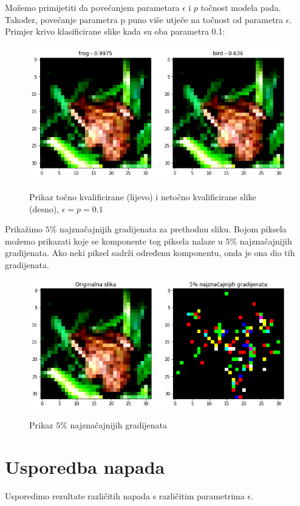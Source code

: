 Možemo primijetiti da povećanjem parametara $\epsilon$ i $p$ točnost modela pada. Također, povećanje parametra p puno više utječe na točnost od parametra $\epsilon$. Primjer krivo klasificirane slike kada su oba parametra 0.1:
\begin{figure}[H]
	\centering
	{{\includegraphics[width=11.5cm]{slike/napadi/selected-grads-example.png} }}%
	\caption{Prikaz točno kvalificirane (lijevo) i netočno kvalificirane slike (desno), $\epsilon = p = 0.1$}%
	\label{fig:pixel_fgsm}%
\end{figure}

Prikažimo $5\%$ najznačajnijih gradijenata za prethodnu sliku. Bojom piksela možemo prikazati koje se komponente tog piksela nalaze u $5\%$ najznačajnijih gradijenata. Ako neki piksel sadrži određenu komponentu, onda je ona dio tih gradijenata.
\begin{figure}[H]
	\centering
	{{\includegraphics[width=11.5cm]{slike/napadi/selected-grads-visualisation.png} }}%
	\caption{Prikaz $5\%$ najznačajnijih gradijenata}%
	\label{fig:najznacajniji}%
\end{figure}

\section{Usporedba napada}

Usporedimo rezultate različitih napada s različitim parametrima $\epsilon$. \\

